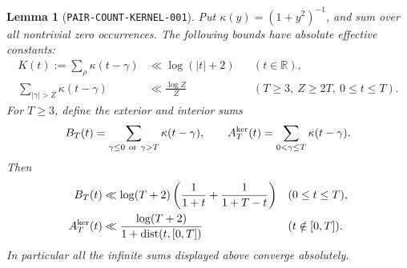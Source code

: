 \documentclass[11pt]{article}
\newtheorem{lemma}{Lemma}
\begin{document}
\begin{lemma}[\texttt{PAIR-COUNT-KERNEL-001}]\label{lem:count-kernel}
Put \(\kappa(y)=(1+y^2)^{-1}\), and sum over all nontrivial zero occurrences.
The following bounds have absolute effective constants:
\begin{align}
 K(t):=\sum_\rho\kappa(t-\gamma)&\ll\log(|t|+2)
                  &&(t\in\mathbb R),\label{eq:kernel-global}\\
 \sum_{|\gamma|>Z}\kappa(t-\gamma)&\ll\frac{\log Z}{Z}
                  &&(T\geq3,\ Z\geq2T,\ 0\leq t\leq T).
                  \label{eq:kernel-far}
\end{align}
For \(T\geq3\), define the exterior and interior sums
\[
 B_T(t)=\sum_{\gamma\leq0\ {\rm or}\ \gamma>T}\kappa(t-\gamma),
 \qquad A_T^{\rm ker}(t)=\sum_{0<\gamma\leq T}\kappa(t-\gamma).
\]
Then
\begin{align}
 B_T(t)&\ll\log(T+2)
     \left(\frac1{1+t}+\frac1{1+T-t}\right)
                         &&(0\leq t\leq T),\label{eq:kernel-boundary}\\
 A_T^{\rm ker}(t)&\ll
 \frac{\log(T+2)}{1+\operatorname{dist}(t,[0,T])}
                         &&(t\notin[0,T]).\label{eq:kernel-extension}
\end{align}
In particular all the infinite sums displayed above converge absolutely.
\end{lemma}
\end{document}
